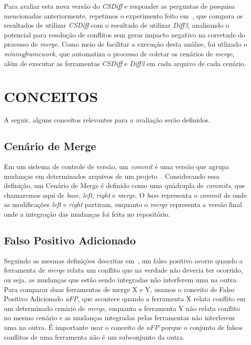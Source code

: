 Para avaliar esta nova versão do \emph{CSDiff} e responder as perguntas de pesquisa mencionadas anteriormente, repetimos
o experimento feito em~\cite{heitor21,clem21}, que compara os resultados de utilizar \emph{CSDiff} com o resultado
de utilizar \emph{Diff3}, analisando o potencial para resolução de conflitos sem gerar impacto negativo na corretude do
processo de \emph{merge}. Como meio de facilitar a execução desta análise, foi utlizado o \emph{miningframework}, que
automatiza o processo de coletar os cenários de \emph{merge}, além de executar as ferramentas \emph{CSDiff} e \emph{Diff3} em
cada arquivo de cada cenário.

\section{CONCEITOS}\label{conceitos}
A seguir, alguns conceitos relevantes para a avaliação serão definidos.
\subsection{Cenário de Merge}
Em um sistema de controle de versão, um \emph{commit} é uma versão que agrupa mudanças em
determinados arquivos de um projeto~\cite{koc11}.
Considerando essa definição, um Cenário de Merge é definido como uma quádrupla de \emph{commits},
que chamaremos aqui de \emph{base},
\emph{left}, \emph{right} e \emph{merge}. O \emph{base} representa o \emph{commit} de onde as modificações \emph{left} e \emph{right}
partiram, enquanto o \emph{merge} representa a versão final onde a integração das mudanças foi feita no repositório.
\subsection{Falso Positivo Adicionado}
Seguindo as mesmas definições descritas em~\cite{clem21},
um falso positivo ocorre quando a ferramenta de \emph{merge} relata um conflito
que na verdade não deveria ter ocorrido, ou seja, as
mudanças que estão sendo integradas
não interferem uma na outra. Para comparar duas ferramentas de merge
X e Y, usamos o conceito de Falso Positivo Adicionado \emph{aFP}, que acontece quando
a ferramenta X relata conflito em um determinado cenário de \emph{merge},
enquanto a ferramenta Y não relata conflito no mesmo cenário e
as mudanças integradas pelas ferramentas não interferem uma na outra.
É importante usar o conceito de \emph{aFP} porque o conjunto de falsos conflitos
de uma ferramenta não é um subconjunto da outra.
